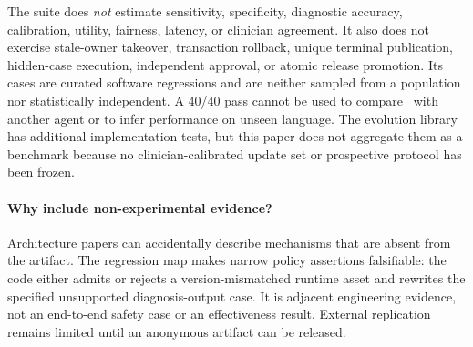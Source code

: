 The suite does \emph{not} estimate sensitivity, specificity, diagnostic
accuracy, calibration, utility, fairness, latency, or clinician agreement.  It
also does not exercise stale-owner takeover, transaction rollback, unique
terminal publication, hidden-case execution, independent approval, or atomic
release promotion.  Its cases are curated software regressions and are neither
sampled from a population nor statistically independent.  A 40/40 pass cannot
be used to compare \system\ with another agent or to infer performance on
unseen language.  The evolution library has additional implementation tests,
but this paper does not aggregate them as a benchmark because no
clinician-calibrated update set or prospective protocol has been frozen.

\paragraph{Why include non-experimental evidence?}
Architecture papers can accidentally describe mechanisms that are absent from
the artifact.  The regression map makes narrow policy assertions falsifiable:
the code either admits or rejects a version-mismatched runtime asset and
rewrites the specified unsupported diagnosis-output case.  It is adjacent
engineering evidence, not an end-to-end safety case or an effectiveness
result.  External replication remains limited until an anonymous artifact can
be released.
